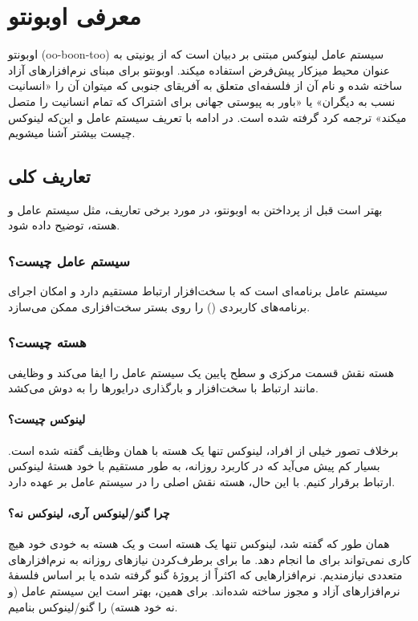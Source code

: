 \chapter{معرفی اوبونتو}
اوبونتو (oo-boon-too) سیستم عامل لینوکس مبتنی بر دبیان است که از یونیتی به عنوان محیط میزکار پیش‌فرض استفاده میکند. اوبونتو برای مبنای نرم‌افزارهای آزاد ساخته شده و نام آن از فلسفه‌ای متعلق به آفریقای جنوبی که میتوان آن را «انسانیت نسب به دیگران» یا «باور به پیوستی جهانی برای اشتراک که تمام انسانیت را متصل میکند» ترجمه کرد گرفته شده است.
در ادامه با تعریف سیستم عامل و این‌که لینوکس چیست بیشتر آشنا میشویم.
\section{تعاریف کلی}
بهتر است قبل از پرداختن به اوبونتو، در مورد برخی تعاریف، مثل سیستم عامل و هسته، توضیح داده شود.
\subsection{سیستم عامل چیست؟}
سیستم عامل برنامه‌ای است که با سخت‌افزار ارتباط مستقیم دارد و امکان اجرای برنامه‌های کاربردی () را روی بستر سخت‌افزاری ممکن می‌سازد.
\subsection{هسته چیست؟}
هسته نقش قسمت مرکزی و سطح پایین یک سیستم عامل را ایفا می‌کند و وظایفی مانند ارتباط با سخت‌افزار و بارگذاری درایورها را به دوش می‌کشد.
\subsubsection{لینوکس چیست؟}
برخلاف تصور خیلی از افراد، لینوکس تنها یک هسته با همان وظایف گفته شده است. بسیار کم پیش می‌آید که در کاربرد روزانه، به طور مستقیم با خود هستهٔ لینوکس ارتباط برقرار کنیم. با این حال، هسته نقش اصلی را در سیستم عامل بر عهده دارد.
\subsubsection{چرا گنو/لینوکس آری، لینوکس نه؟}
همان طور که گفته شد، لینوکس تنها یک هسته است و یک هسته به خودی خود هیچ کاری نمی‌تواند برای ما انجام دهد. ما برای برطرف‌کردن نیازهای روزانه به نرم‌افزارهای متعددی نیازمندیم. نرم‌افزارهایی که اکثراً از پروژهٔ گنو گرفته شده یا بر اساس فلسفهٔ نرم‌افزارهای آزاد و مجوز  ساخته شده‌اند. برای همین، بهتر است این سیستم عامل (و نه خود هسته) را گنو/لینوکس بنامیم.
